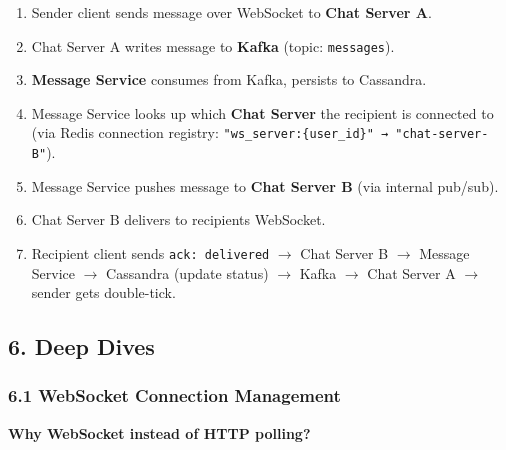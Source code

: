 \documentclass[11pt]{article}
\providecommand{\tightlist}{\setlength{\itemsep}{1pt}\setlength{\parskip}{0pt}}
\begin{document}
\begin{enumerate}
\def\labelenumi{\arabic{enumi}.}
\tightlist
\item
  Sender client sends message over WebSocket to \textbf{Chat Server A}.
\item
  Chat Server A writes message to \textbf{Kafka} (topic: \texttt{messages}).
\item
  \textbf{Message Service} consumes from Kafka, persists to Cassandra.
\item
  Message Service looks up which \textbf{Chat Server} the recipient is connected to (via Redis connection registry: \texttt{"ws\_server:\{user\_id\}"\ →\ "chat-server-B"}).
\item
  Message Service pushes message to \textbf{Chat Server B} (via internal pub/sub).
\item
  Chat Server B delivers to recipient\textquotesingle s WebSocket.
\item
  Recipient client sends \texttt{ack:\ delivered} \(\rightarrow\) Chat Server B \(\rightarrow\) Message Service \(\rightarrow\) Cassandra (update status) \(\rightarrow\) Kafka \(\rightarrow\) Chat Server A \(\rightarrow\) sender gets double-tick.
\end{enumerate}

\subsection{6. Deep Dives}\label{6-deep-dives-3}

\subsubsection{6.1 WebSocket Connection Management}\label{61-websocket-connection-management}

\textbf{Why WebSocket instead of HTTP polling?}
\end{document}
